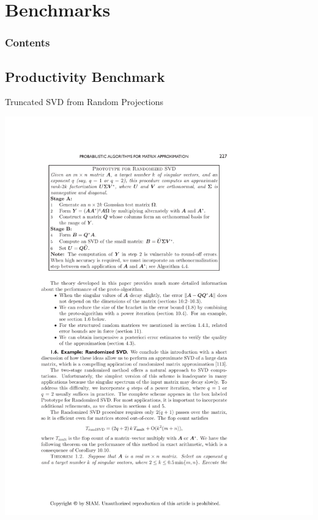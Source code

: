 \section{Benchmarks}

\hidenum
\begin{frame}[noframenumbering]
\frametitle{Contents}
\end{frame}
\shownum

\subsection{Productivity Benchmark}

\begin{frame}[fragile]
\fontsize{8pt}{10}\selectfont
\begin{block}{Truncated SVD from Random Projections\footnotemark}
  \begin{minipage}{.55\textwidth}
    \begin{center}
      \includegraphics[width=.95\textwidth]{../common/pics/randSVDalg}
      \\

\end{center}
\end{minipage}
\end{block}
\end{frame}

